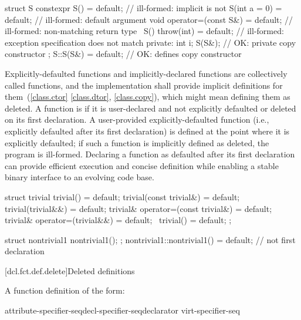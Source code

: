 \pnum
\enterexample
\begin{codeblock}
struct S {
  constexpr S() = default;                  // ill-formed: implicit  is not 
  S(int a = 0) = default;                   // ill-formed: default argument
  void operator=(const S&) = default;       // ill-formed: non-matching return type
  ~S() throw(int) = default;                // ill-formed: exception specification does not match
private:
  int i;
  S(S&);                                    // OK: private copy constructor
};
S::S(S&) = default;                         // OK: defines copy constructor
\end{codeblock}
\exitexample

\pnum
Explicitly-defaulted functions and implicitly-declared functions are collectively
called  functions, and the implementation
shall provide implicit definitions
for them~(\ref{class.ctor}
\ref{class.dtor}, \ref{class.copy}), which might mean defining them as deleted.
A function is
 if it is user-declared and not explicitly
defaulted or deleted on its first declaration. A user-provided explicitly-defaulted function
(i.e., explicitly defaulted after its first declaration)
is defined at the point where it is explicitly defaulted; if such a function is implicitly
defined as deleted, the program is ill-formed.
\enternote
Declaring a function as defaulted after its first declaration can provide
efficient execution and concise
definition while enabling a stable binary interface to an evolving code
base.\exitnote

\pnum
\enterexample

\begin{codeblock}
struct trivial {
  trivial() = default;
  trivial(const trivial&) = default;
  trivial(trivial&&) = default;
  trivial& operator=(const trivial&) = default;
  trivial& operator=(trivial&&) = default;
  ~trivial() = default;
};

struct nontrivial1 {
  nontrivial1();
};
nontrivial1::nontrivial1() = default;           // not first declaration
\end{codeblock}
\exitexample

[dcl.fct.def.delete]{Deleted definitions}%

\pnum
A function definition of the form:

\begin{ncbnf}
    attribute-specifier-seq\opt decl-specifier-seq\opt declarator virt-specifier-seq\opt {}
\end{ncbnf}


